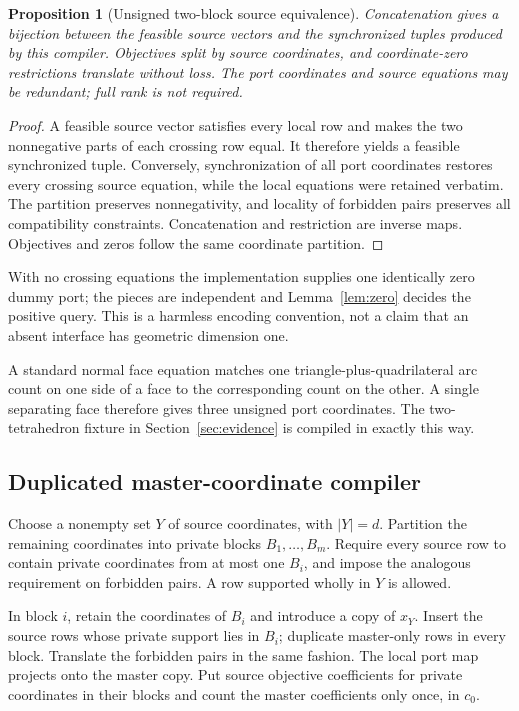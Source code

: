 \documentclass[11pt,a4paper]{article}
\newtheorem{proposition}[theorem]{Proposition}
\theoremstyle{definition}
\theoremstyle{remark}
\begin{document}
\begin{proposition}[Unsigned two-block source equivalence]
\label{prop:two-source}
Concatenation gives a bijection between the feasible source vectors and the synchronized tuples produced by this compiler. Objectives split by source coordinates, and coordinate-zero restrictions translate without loss. The port coordinates and source equations may be redundant; full rank is not required.
\end{proposition}
\begin{proof}
A feasible source vector satisfies every local row and makes the two nonnegative parts of each crossing row equal. It therefore yields a feasible synchronized tuple. Conversely, synchronization of all port coordinates restores every crossing source equation, while the local equations were retained verbatim. The partition preserves nonnegativity, and locality of forbidden pairs preserves all compatibility constraints. Concatenation and restriction are inverse maps. Objectives and zeros follow the same coordinate partition.
\end{proof}

With no crossing equations the implementation supplies one identically zero dummy port; the pieces are independent and Lemma~\ref{lem:zero} decides the positive query. This is a harmless encoding convention, not a claim that an absent interface has geometric dimension one.

A standard normal face equation matches one triangle-plus-quadrilateral arc count on one side of a face to the corresponding count on the other. A single separating face therefore gives three unsigned port coordinates. The two-tetrahedron fixture in Section~\ref{sec:evidence} is compiled in exactly this way.

\subsection{Duplicated master-coordinate compiler}
Choose a nonempty set $Y$ of source coordinates, with $|Y|=d$. Partition the remaining coordinates into private blocks $B_1,\ldots,B_m$. Require every source row to contain private coordinates from at most one $B_i$, and impose the analogous requirement on forbidden pairs. A row supported wholly in $Y$ is allowed.

In block $i$, retain the coordinates of $B_i$ and introduce a copy of $x_Y$. Insert the source rows whose private support lies in $B_i$; duplicate master-only rows in every block. Translate the forbidden pairs in the same fashion. The local port map projects onto the master copy. Put source objective coefficients for private coordinates in their blocks and count the master coefficients only once, in $c_0$.
\end{document}
